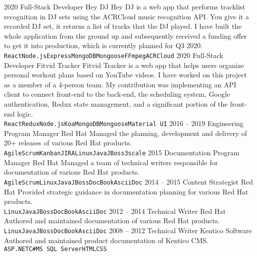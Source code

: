 \documentclass[9pt]{developercv}
\begin{document}
\begin{entrylist}
  \entry
  {2020}
  {Full-Stack Developer}
  {Hey DJ}
  {Hey DJ is a web app that performs tracklist recognition in DJ sets using the ACRCloud music recognition API. You give it a recorded DJ set, it returns a list of tracks that the DJ played. I have built the whole application from the ground up and subsequently received a funding offer to get it into production, which is currently planned for Q3 2020.\\ \texttt{React}\slashsep\texttt{Node.js}\slashsep\texttt{Express}\slashsep\texttt{MongoDB}\slashsep\texttt{Mongoose}\slashsep\texttt{FFmpeg}\slashsep\texttt{ACRCloud}}
  \entry
  {2020}
  {Full-Stack Developer}
  {Fitvid Tracker}
  {Fitvid Tracker is a web app that helps users organize personal workout plans based on YouTube videos. I have worked on this project as a member of a 4-person team. My contribution was implementing an API client to connect front-end to the back-end, the scheduling system, Google authentication, Redux state management, and a significant portion of the front-end logic.\\ \texttt{React}\slashsep\texttt{Redux}\slashsep\texttt{Node.js}\slashsep\texttt{Koa}\slashsep\texttt{MongoDB}\slashsep\texttt{Mongoose}\slashsep\texttt{Material UI}}
  \entry
  {2016 -- 2019}
  {Engineering Program Manager}
  {Red Hat}
  {Managed the planning, development and delivery of 20+ releases of various Red Hat products.\\ \texttt{Agile}\slashsep\texttt{Scrum}\slashsep\texttt{Kanban}\slashsep\texttt{JIRA}\slashsep\texttt{Linux}\slashsep\texttt{Java}\slashsep\texttt{JBoss}\slashsep\texttt{3scale}}
  \entry
  {2015}
  {Documentation Program Manager}
  {Red Hat}
  {Managed a team of technical writers responsible for documentation of various Red Hat products.\\ \texttt{Agile}\slashsep\texttt{Scrum}\slashsep\texttt{Linux}\slashsep\texttt{Java}\slashsep\texttt{JBoss}\slashsep\texttt{DocBook}\slashsep\texttt{AsciiDoc}}
  \entry
  {2014 -- 2015}
  {Content Strategist}
  {Red Hat}
  {Provided strategic guidance in documentation planning for various Red Hat products.\\ \texttt{Linux}\slashsep\texttt{Java}\slashsep\texttt{JBoss}\slashsep\texttt{DocBook}\slashsep\texttt{AsciiDoc}}
  \entry
  {2012 -- 2014}
  {Technical Writer}
  {Red Hat}
  {Authored and maintained documentation of various Red Hat products.\\ \texttt{Linux}\slashsep\texttt{Java}\slashsep\texttt{JBoss}\slashsep\texttt{DocBook}\slashsep\texttt{AsciiDoc}}
  \entry
  {2008 -- 2012}
  {Technical Writer}
  {Kentico Software}
  {Authored and maintained product documentation of Kentico CMS.\\ \texttt{ASP.NET}\slashsep\texttt{C\#}\slashsep\texttt{MS SQL Server}\slashsep\texttt{HTML}\slashsep\texttt{CSS}}
\end{entrylist}
\end{document}
